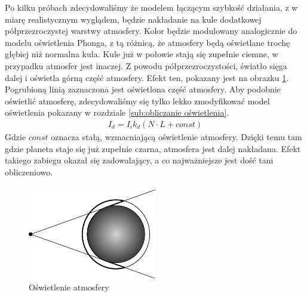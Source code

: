 Po kilku próbach zdecydowaliśmy że modelem łączącym szybkość działania, z w miarę realistycznym wyglądem, będzie nakładanie na kule dodatkowej półprzezroczystej warstwy atmosfery. Kolor będzie modulowany analogicznie do modelu oświetlenia Phonga, z tą różnicą, że atmosfery będą oświetlane trochę głębiej niż normalna kula. Kule już w połowie stają się zupełnie ciemne, w przypadku atmosfer jest inaczej. Z powodu półprzezroczystości, światło sięga dalej i oświetla górną część atmosfery. Efekt ten, pokazany jest na obrazku \hyperref[fig:atmo]{\ref{fig:atmo}}. Pogrubioną linią zaznaczona jest oświetlona część atmosfery. Aby podobnie oświetlić atmosferę, zdecydowaliśmy się tylko lekko zmodyfikować model oświetlenia pokazany w rozdziale \hyperref[sub:obliczanie oświetlenia]{\ref{sub:obliczanie oświetlenia}}.
\begin{eqnarray}
I_d = I_i k_d( N \cdot L + const )
\end{eqnarray}
Gdzie $const$ oznacza stałą, wzmacniającą oświetlenie atmosfery. Dzięki temu tam gdzie planeta staje się już zupełnie czarna, atmosfera jest dalej nakładana. Efekt takiego zabiegu okazał się zadowalający, a co najważniejsze jest dość tani obliczeniowo.


\begin{figure}
\centering
	\includegraphics[width=0.5\textwidth]{img/atm.pdf}
\caption{Oświetlenie atmosfery}
\label{fig:atmo}
\end{figure}

\paragraph{}


